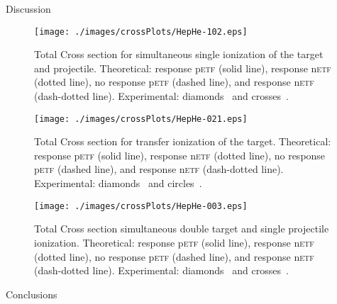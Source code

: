 \documentclass[aps, pra, reprint, groupedaddress, amsfonts,
               amsmath, amssymb, showpacs, nofootinbib]{revtex4-1}
\begin{document}
\begin{section}{Discussion \label{sec:disc}}
   \begin{figure}[htp]
      \centering
      \texttt{[image: ./images/crossPlots/HepHe-102.eps]}
      \caption{Total Cross section for simultaneous single ionization of the target and projectile.
               Theoretical: response p\textsc{etf} (solid line), response n\textsc{etf} (dotted line),
                            no response p\textsc{etf} (dashed line), and response n\textsc{etf}
                            (dash-dotted line).
               Experimental: diamonds~\cite{Dub-89} and crosses~\cite{SSMSM-11}.
 \label{fig:cs102}}
   \end{figure}

   \begin{figure}[htp]
      \centering
      \texttt{[image: ./images/crossPlots/HepHe-021.eps]}
      \caption{Total Cross section for transfer ionization of the target.
               Theoretical: response p\textsc{etf} (solid line), response n\textsc{etf} (dotted line),
                            no response p\textsc{etf} (dashed line), and response n\textsc{etf}
                            (dash-dotted line).
               Experimental: diamonds~\cite{Dub-89} and circles~\cite{FTFHLP-95}.
 \label{fig:cs021}}
   \end{figure}

   \begin{figure}[htp]
      \centering
      \texttt{[image: ./images/crossPlots/HepHe-003.eps]}
      \caption{Total Cross section simultaneous double target and single projectile ionization.
               Theoretical: response p\textsc{etf} (solid line), response n\textsc{etf} (dotted line),
                            no response p\textsc{etf} (dashed line), and response n\textsc{etf}
                            (dash-dotted line).
               Experimental: diamonds~\cite{Dub-89} and crosses~\cite{SSMSM-11}.
 \label{fig:cs003}}
   \end{figure}

\end{section}

\begin{section}{Conclusions \label{sec:conc}}
\end{section}


\end{document}
